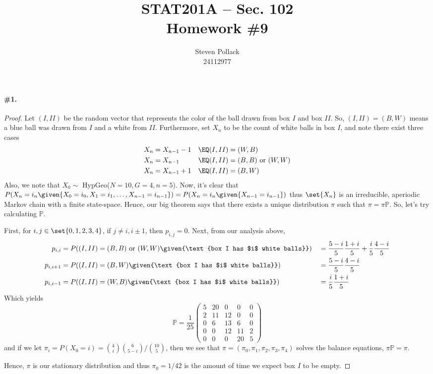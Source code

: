 \documentclass[12pt,titlepage]{article}
\title{STAT201A -- Sec. 102 \\ Homework \#9 }
\author{Steven Pollack \\ 24112977}
\date{}
\renewcommand{\P}{\mathbb{P}}
\begin{document}
\maketitle

\pagestyle{empty}
\newpage
\pagestyle{fancy}

\paragraph{\#1.}
\begin{proof}
Let $(I,II)$ be the random vector that represents the color of the ball drawn from box $I$ and box $II$. So, $(I,II) = (B,W)$ means a blue ball was drawn from $I$ and a white from $II$. Furthermore, set $X_n$ to be the count of white balls in box $I$, and note there exist three cases
\begin{align*}
X_{n} &= X_{n-1} -1 &\EQ (I,II) &= (W,B) \\
X_{n} &= X_{n-1} &\EQ (I,II) &= (B,B) \text{ or } (W,W) \\
X_{n} &= X_{n-1} + 1 &\EQ (I,II) &= (B,W) 
\end{align*}
Also, we note that $X_0 \sim $ HypGeo($N=10,G=4,n=5$). Now, it's clear that $P(X_n = i_n \given{ X_0 = i_0, X_1 = i_1, \ldots, X_{n-1} = i_{n-1}}) = P(X_n = i_n \given{X_{n-1}=i_{n-1}})$ thus $\set{X_{n}}$ is an irreducible, aperiodic Markov chain with a finite state-space. Hence, our big theorem says that there exists a unique distribution $\pi$ such that $\pi = \pi \P$. So, let's try calculating $\P$.

First, for $i,j \in \set{0,1,2,3,4}$, if $j \neq i, i\pm 1$, then $p_{i,j} = 0$. Next, from our analysis above, 
\begin{align*}
p_{i,i} &= P((I,II) = (B,B) \text{ or } (W,W) \given{\text{box I has $i$ white balls}}) &&= \frac{5-i}{5}\frac{1+i}{5} + \frac{i}{5}\frac{4-i}{5} \\
p_{i,i+1} &= P((I,II) = (B,W) \given{\text{box I has $i$ white balls}}) &&= \frac{5-i}{5}\frac{4-i}{5} \\
p_{i,i-1} &=  P((I,II) = (W,B) \given{\text{box I has $i$ white balls}}) &&= \frac{i}{5}\frac{1+i}{5}
\end{align*}
Which yields
\[
\P =\frac{1}{25}
\left(
\begin{array}{ccccc}
 5 & {20} & 0 & 0 & 0 \\
 2 & 11 & 12 & 0 & 0 \\
 0 & 6 & 13 & 6 & 0 \\
 0 & 0 & 12 & 11 & 2 \\
 0 & 0 & 0 & 20 & 5
\end{array}
\right)
\]
and if we let $\pi_{i} = P(X_0 = i) = \binom{4}{i}\binom{6}{5-i}/\binom{10}{5}$, then we see that $\pi = (\pi_0, \pi_1, \pi_2, \pi_3, \pi_4)$ solves the balance equations, $\pi \P = \pi$. 

Hence, $\pi$ is our stationary distribution and thus $\pi_0 = 1/42$ is the amount of time we expect box $I$ to be empty.
\end{proof}
\end{document}
